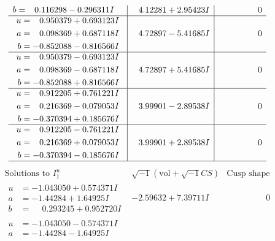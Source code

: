 \documentclass[1p]{elsarticle_modified}
\theoremstyle{definition}
\newcommand{\I}{\sqrt{-1}}
\begin{document}
$$\begin{array}{c|c|c}
\begin{aligned}
b &= \phantom{-}0.116298 - 0.296311 I\end{aligned}
 & \phantom{-}4.12281 + 2.95423 I & \phantom{-0.000000 } 0 \\ \hline\begin{aligned}
u &= \phantom{-}0.950379 + 0.693123 I \\
a &= \phantom{-}0.098369 + 0.687118 I \\
b &= -0.852088 - 0.816566 I\end{aligned}
 & \phantom{-}4.72897 - 5.41685 I & \phantom{-0.000000 } 0 \\ \hline\begin{aligned}
u &= \phantom{-}0.950379 - 0.693123 I \\
a &= \phantom{-}0.098369 - 0.687118 I \\
b &= -0.852088 + 0.816566 I\end{aligned}
 & \phantom{-}4.72897 + 5.41685 I & \phantom{-0.000000 } 0 \\ \hline\begin{aligned}
u &= \phantom{-}0.912205 + 0.761221 I \\
a &= \phantom{-}0.216369 - 0.079053 I \\
b &= -0.370394 + 0.185676 I\end{aligned}
 & \phantom{-}3.99901 - 2.89538 I & \phantom{-0.000000 } 0 \\ \hline\begin{aligned}
u &= \phantom{-}0.912205 - 0.761221 I \\
a &= \phantom{-}0.216369 + 0.079053 I \\
b &= -0.370394 - 0.185676 I\end{aligned}
 & \phantom{-}3.99901 + 2.89538 I & \phantom{-0.000000 } 0\\
 \hline 
 \end{array}$$\newpage$$\begin{array}{c|c|c}  
\text{Solutions to }I^u_{1}& \I (\text{vol} + \sqrt{-1}CS) & \text{Cusp shape}\\
 \hline 
\begin{aligned}
u &= -1.043050 + 0.574371 I \\
a &= -1.44284 + 1.64925 I \\
b &= \phantom{-}0.293245 + 0.952720 I\end{aligned}
 & -2.59632 + 7.39711 I & \phantom{-0.000000 } 0 \\ \hline\begin{aligned}
u &= -1.043050 - 0.574371 I \\
a &= -1.44284 - 1.64925 I \\

\end{aligned}
\end{array}$$
\end{document}

